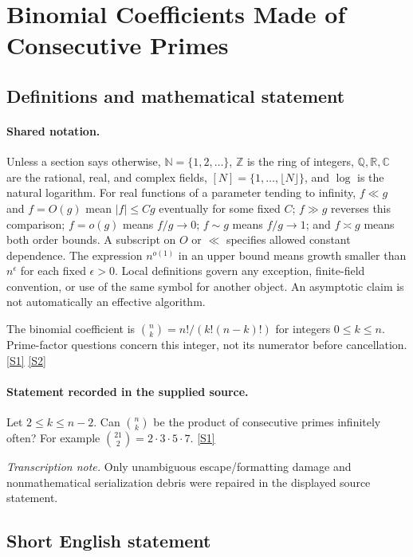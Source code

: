 \documentclass[11pt,a4paper]{article}
\newcommand{\N}{\mathbb{N}}
\newcommand{\Z}{\mathbb{Z}}
\newcommand{\Q}{\mathbb{Q}}
\newcommand{\R}{\mathbb{R}}
\newcommand{\C}{\mathbb{C}}
\newcommand{\sref}[2]{\hyperlink{source:#1:#2}{[S#2]}}
\begin{document}
\section{Binomial Coefficients Made of Consecutive Primes}\label{statement}


\subsection{Definitions and mathematical statement}

\paragraph{Shared notation.}Unless a section says otherwise, $\N=\{1,2,\ldots\}$,
$\Z$ is the ring of integers, $\Q,\R,\C$ are the rational, real, and complex
fields, $[N]=\{1,\ldots,\lfloor N\rfloor\}$, and $\log$ is the natural
logarithm. For real functions of a parameter tending to infinity,
$f\ll g$ and $f=O(g)$ mean $|f|\leq Cg$ eventually for some fixed $C$;
$f\gg g$ reverses this comparison; $f=o(g)$ means $f/g\to0$;
$f\sim g$ means $f/g\to1$; and $f\asymp g$ means both order bounds.
A subscript on $O$ or $\ll$ specifies allowed constant dependence.
The expression $n^{o(1)}$ in an upper bound means growth smaller than
$n^\epsilon$ for each fixed $\epsilon>0$. Local definitions govern any
exception, finite-field convention, or use of the same symbol for another
object. An asymptotic claim is not automatically an effective algorithm.



The binomial coefficient is $\binom nk=n!/(k!(n-k)!)$ for integers $0\leq k\leq n$. Prime-factor questions concern this integer, not its numerator before cancellation. \sref{statement}{1} \sref{statement}{2}

\paragraph{Statement recorded in the supplied source.}
Let $2\leq k\leq n-2$. Can $\binom{n}{k}$ be the product of consecutive primes infinitely often? For example $ \binom{21}{2}=2\cdot 3\cdot 5\cdot 7. $ \sref{statement}{1}

{\small\emph{Transcription note.} Only unambiguous escape/formatting damage and nonmathematical serialization debris were repaired in the displayed source statement.}

\subsection{Short English statement}
\end{document}
